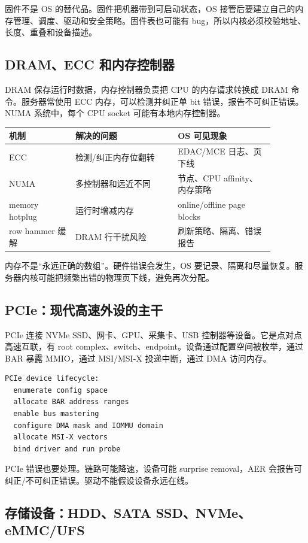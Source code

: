 固件不是 OS 的替代品。固件把机器带到可启动状态，OS 接管后要建立自己的内存管理、调度、驱动和安全策略。固件表也可能有 bug，所以内核必须校验地址、长度、重叠和设备描述。

\subsection{DRAM、ECC 和内存控制器}

DRAM 保存运行时数据，内存控制器负责把 CPU 的内存请求转换成 DRAM 命令。服务器常使用 ECC 内存，可以检测并纠正单 bit 错误，报告不可纠正错误。NUMA 系统中，每个 CPU socket 可能有本地内存控制器。

\begin{longtable}{p{0.22\linewidth}p{0.34\linewidth}p{0.32\linewidth}}
\toprule
机制 & 解决的问题 & OS 可见现象 \\
\midrule
ECC & 检测/纠正内存位翻转 & EDAC/MCE 日志、页下线 \\
NUMA & 多控制器和远近不同 & 节点、CPU affinity、内存策略 \\
memory hotplug & 运行时增减内存 & online/offline page blocks \\
row hammer 缓解 & DRAM 行干扰风险 & 刷新策略、隔离、错误报告 \\
\bottomrule
\end{longtable}

内存不是“永远正确的数组”。硬件错误会发生，OS 要记录、隔离和尽量恢复。服务器内核可能把频繁出错的物理页下线，避免再次分配。

\subsection{PCIe：现代高速外设的主干}

PCIe 连接 NVMe SSD、网卡、GPU、采集卡、USB 控制器等设备。它是点对点高速互联，有 root complex、switch、endpoint。设备通过配置空间被枚举，通过 BAR 暴露 MMIO，通过 MSI/MSI-X 投递中断，通过 DMA 访问内存。

\begin{lstlisting}
PCIe device lifecycle:
  enumerate config space
  allocate BAR address ranges
  enable bus mastering
  configure DMA mask and IOMMU domain
  allocate MSI-X vectors
  bind driver and run probe
\end{lstlisting}

PCIe 错误也要处理。链路可能降速，设备可能 surprise removal，AER 会报告可纠正/不可纠正错误。驱动不能假设设备永远在线。

\subsection{存储设备：HDD、SATA SSD、NVMe、eMMC/UFS}

